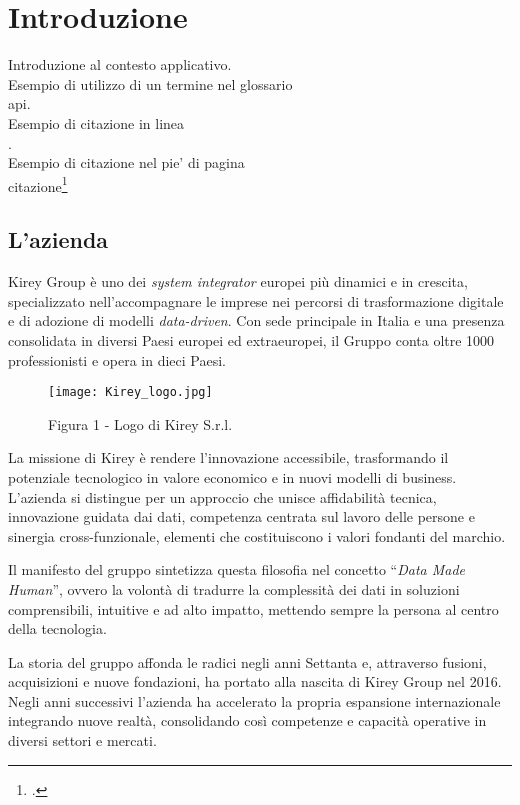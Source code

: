 \chapter{Introduzione}
\label{cap:introduzione}

Introduzione al contesto applicativo.\\

\noindent Esempio di utilizzo di un termine nel glossario \\
\gls{api}. \\

\noindent Esempio di citazione in linea \\
\cite{site:agile-manifesto}. \\

\noindent Esempio di citazione nel pie' di pagina \\
citazione\footcite{womak:lean-thinking} \\

\section{L'azienda}
Kirey Group è uno dei \emph{system integrator} europei più dinamici e in crescita, specializzato nell'accompagnare le imprese nei percorsi di trasformazione digitale
 e di adozione di modelli \emph{data-driven}. Con sede principale in Italia e una presenza consolidata in diversi Paesi europei ed extraeuropei, 
 il Gruppo conta oltre 1000 professionisti e opera in dieci Paesi.

\begin{figure}[!h] 
    \centering 
    \texttt{[image: Kirey\_logo.jpg]} 
    \caption{Figura 1 - Logo di Kirey S.r.l.}
\end{figure}

La missione di Kirey è rendere l'innovazione accessibile, trasformando il potenziale tecnologico in valore economico e in nuovi modelli di business. 
L'azienda si distingue per un approccio che unisce affidabilità tecnica, innovazione guidata dai dati, competenza centrata sul lavoro delle persone e sinergia cross-funzionale, 
elementi che costituiscono i valori fondanti del marchio.

Il manifesto del gruppo sintetizza questa filosofia nel concetto “\emph{Data Made Human}”, ovvero la volontà di tradurre la complessità dei dati in soluzioni comprensibili, 
intuitive e ad alto impatto, mettendo sempre la persona al centro della tecnologia.

La storia del gruppo affonda le radici negli anni Settanta e, attraverso fusioni, acquisizioni e nuove fondazioni, ha portato alla nascita di Kirey Group nel 2016. 
Negli anni successivi l'azienda ha accelerato la propria espansione internazionale integrando nuove realtà, consolidando così competenze e capacità operative in diversi settori e mercati.

